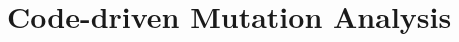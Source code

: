 \clearpage
\section{Code-driven Mutation Analysis}
\label{sec:testSuiteEvaluation:codeDriven}





%
%
%
%
%
%
%

%